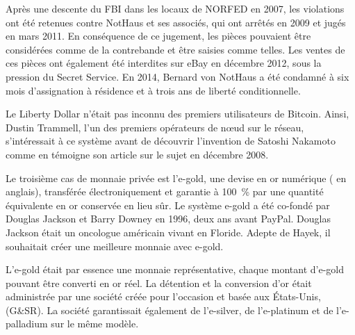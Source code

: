 Après une descente du FBI dans les locaux de NORFED en 2007, les violations ont été retenues contre NotHaus et ses associés, qui ont arrêtés en 2009 et jugés en mars 2011. En conséquence de ce jugement, les pièces pouvaient être considérées comme de la contrebande et être saisies comme telles. Les ventes de ces pièces ont également été interdites sur eBay en décembre 2012, sous la pression du Secret Service. En 2014, Bernard von NotHaus a été condamné à six mois d'assignation à résidence et à trois ans de liberté conditionnelle.

Le Liberty Dollar n'était pas inconnu des premiers utilisateurs de Bitcoin. Ainsi, Dustin Trammell, l'un des premiers opérateurs de nœud sur le réseau, s'intéressait à ce système avant de découvrir l'invention de Satoshi Nakamoto comme en témoigne son article sur le sujet en décembre 2008.


Le troisième cas de monnaie privée est l'e-gold, une devise en or numérique ( en anglais), transférée électroniquement et garantie à 100~\% par une quantité équivalente en or conservée en lieu sûr. Le système e-gold a été co-fondé par Douglas Jackson et Barry Downey en 1996, deux ans avant PayPal. Douglas Jackson était un oncologue américain vivant en Floride. Adepte de Hayek, il souhaitait créer une meilleure monnaie avec e-gold.


L'e-gold était par essence une monnaie représentative, chaque montant d'e-gold pouvant être converti en or réel. La détention et la conversion d'or était administrée par une société créée pour l'occasion et basée aux États-Unis,  (G\&SR). La société garantissait également de l'e-silver, de l'e-platinum et de l'e-palladium sur le même modèle.

